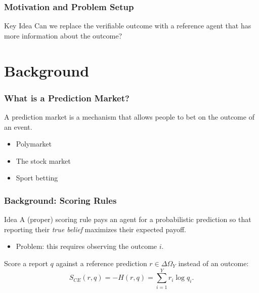 \documentclass[
	11pt, %
]{beamer}
\begin{document}
\begin{frame}
	\frametitle{Motivation and Problem Setup}
	
	\begin{block}{Key Idea}
		Can we replace the verifiable outcome with a reference agent that has more information about the outcome?
	\end{block}
\end{frame}

\section{Background}

\begin{frame}
	\frametitle{What is a Prediction Market?}
	
	\begin{definition}
		A prediction market is a mechanism that allows people to bet on the outcome of an event.
	\end{definition}

	\begin{example}
		\begin{itemize}
			\item Polymarket
			\item The stock market
			\item Sport betting
		\end{itemize}
	\end{example}

\end{frame}

\begin{frame}
	\frametitle{Background: Scoring Rules}

	\begin{block}{Idea}
		A \alert{(proper) scoring rule} pays an agent for a probabilistic
		prediction so that reporting their \emph{true belief} maximizes their
		expected payoff.
	\end{block}

	\vspace{0.5em}
	\begin{itemize}
		\item \alert{Problem:} this requires observing the outcome $i$.
	\end{itemize}

	\begin{definition}
		Score a report $q$ against a \alert{reference prediction}
		$r \in \Delta\Omega_Y$ instead of an outcome:
		$$
		S_{CE}(r, q) = -H(r, q) = \sum_{i=1}^{Y} r_i \log q_i .
		$$
	\end{definition}

\end{frame}
\end{document}
